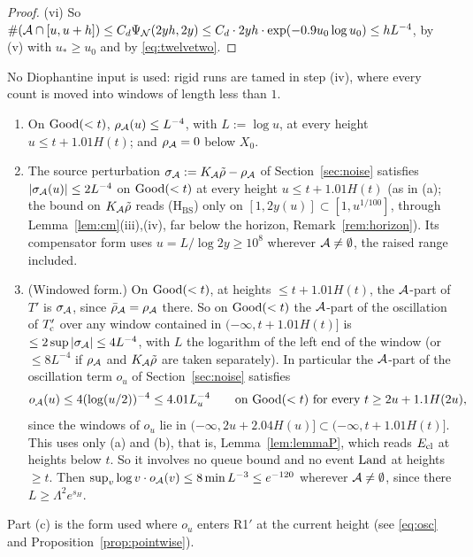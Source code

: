 \begin{proof}
(vi) So $\#(\mathcal{A}\cap[u,u+h])\le C_d\Psi_{\mathcal{N}}(2yh,2y)\le C_d\cdot2yh\cdot\exp(-0.9u_0\log u_0)\le hL^{-4}$, by (v) with
$u_*\ge u_0$ and by \eqref{eq:twelvetwo}.
\end{proof}

No Diophantine input is used: rigid runs are tamed in step (iv), where every count is moved into windows of length less
than $1$.

\begin{lemma}\label{lem:rhoA}
\begin{enumerate}[label=\textup{(\alph*)}]
\item On $\mathrm{Good}(<t)$, $\rho_{\mathcal{A}}(u)\le L^{-4}$, with $L:=\log u$, at every height $u\le t+1.01H(t)$; and $\rho_{\mathcal{A}}=0$
  below $X_0$.
\item The source perturbation $\sigma_{\mathcal{A}}:=K_{\mathcal{A}}\tilde\rho-\rho_{\mathcal{A}}$ of Section~\ref{sec:noise} satisfies
  $|\sigma_{\mathcal{A}}(u)|\le2L^{-4}$ on $\mathrm{Good}(<t)$ at every height $u\le t+1.01H(t)$ (as in (a); the bound on $K_{\mathcal{A}}\tilde\rho$
  reads (H$_{\mathrm{BS}}$) only on $[1,2y(u)]\subset[1,u^{1/100}]$, through Lemma~\ref{lem:cm}(iii),(iv), far below the horizon,
  Remark~\ref{rem:horizon}). Its compensator form uses $u=L/\log2y\ge10^8$ wherever $\mathcal{A}\ne\emptyset$, the raised
  range included.
\item (Windowed form.) On $\mathrm{Good}(<t)$, at heights $\le t+1.01H(t)$, the $\mathcal{A}$-part of $T'$ is $\sigma_{\mathcal{A}}$, since
  $\bar\rho_{\mathcal{A}}=\rho_{\mathcal{A}}$ there. So on $\mathrm{Good}(<t)$ the $\mathcal{A}$-part of the oscillation of $T'_{\mathrm{c}}$ over any window
  contained in $(-\infty,t+1.01H(t)]$ is $\le2\sup|\sigma_{\mathcal{A}}|\le4L^{-4}$, with $L$ the logarithm of the left end of the
  window (or $\le8L^{-4}$ if $\rho_{\mathcal{A}}$ and $K_{\mathcal{A}}\tilde\rho$ are taken separately). In particular the $\mathcal{A}$-part of the
  oscillation term $o_u$ of Section~\ref{sec:noise} satisfies
  \[
  o_{\mathcal{A}}(u)\le4(\log(u/2))^{-4}\le4.01L_u^{-4}\qquad\text{on }\mathrm{Good}(<t)\text{ for every }t\ge2u+1.1H(2u),
  \]
  since the windows of $o_u$ lie in $(-\infty,2u+2.04H(u)]\subset(-\infty,t+1.01H(t)]$. This uses only (a) and (b), that is,
  Lemma~\ref{lem:lemmaP}, which reads $E_{\mathrm{cl}}$ at heights below $t$. So it involves no queue bound and no event $\mathrm{Land}$ at
  heights $\ge t$. Then $\sup_v\log v\cdot o_{\mathcal{A}}(v)\le8\min L^{-3}\le e^{-120}$ wherever $\mathcal{A}\ne\emptyset$,
  since there $L\ge\Lambda^2e^{s_H}$.
\end{enumerate}
Part (c) is the form used where $o_u$ enters R1$'$ at the current height (see \eqref{eq:osc} and Proposition~\ref{prop:pointwise}).
\end{lemma}

